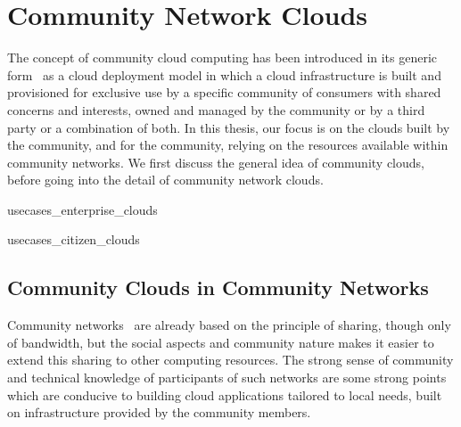 
\section{Community Network Clouds}
\label{sec__CN_Clouds}

The concept of community cloud computing has been introduced in its generic form~\cite{Mell2011} 
as a cloud deployment model in which a cloud infrastructure is built and provisioned for  exclusive use by a specific community of consumers with shared concerns and interests, 
owned and managed by the community or by a third party or a combination of both.
In this thesis, our focus is on the clouds built by the community, and for the community, 
relying on the resources available within community networks.
We first discuss the general idea of community clouds, before going into the detail of community network clouds.


{usecases_enterprise_clouds}

{usecases_citizen_clouds}

\subsection{Community Clouds in Community Networks}
\label{sec__CN_Clouds_Details}

Community networks~\cite{Braem2013} are already based on the principle of sharing, though only of bandwidth, 
but the social aspects and community nature makes it easier to extend this sharing to other computing resources. 
The strong sense of community and technical knowledge of participants of such networks are some strong points 
which are conducive to building cloud applications tailored to local needs, built on infrastructure provided by the community members.



